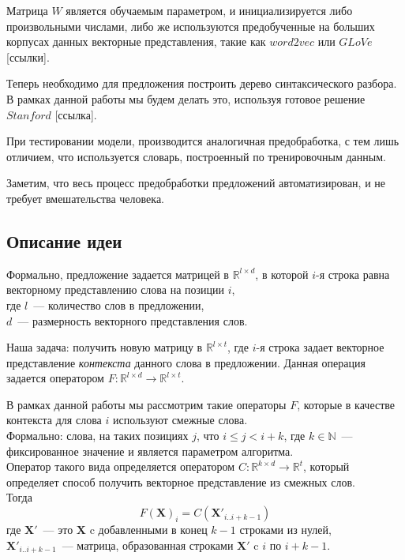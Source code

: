 Матрица $W$ является обучаемым параметром, и инициализируется либо произвольными числами, 
либо же используются предобученные на больших корпусах данных векторные представления, 
такие как $word2vec$ или $GLoVe$ [ссылки].

Теперь необходимо для предложения построить дерево синтаксического разбора.
В рамках данной работы мы будем делать это, используя готовое решение $Stanford$ [ссылка].

При тестировании модели, производится аналогичная предобработка, 
с тем лишь отличием, что используется словарь, построенный по тренировочным данным.

Заметим, что весь процесс предобработки предложений автоматизирован, 
и не требует вмешательства человека.

\subsection{Описание идеи }

Формально, предложение задается матрицей в  $\mathbb{R}^{l \times{} d}$, в которой $i$-я строка равна векторному представлению слова на позиции $i$,\\
где $l$~--- количество слов в предложении,\\
$d$~--- размерность векторного представления слов. 

Наша задача: получить новую матрицу в $\mathbb{R}^{l \times {} t}$, где $i$-я строка задает векторное представление \textit{контекста} данного слова в предложении. 
Данная операция задается оператором $F:\mathbb{R}^{l \times d} \to \mathbb{R}^{l \times t}$.

В рамках данной работы мы рассмотрим такие операторы $F$, которые в качестве контекста
для слова $i$ используют смежные слова.\\
Формально: слова, на таких позициях $j$, что $i \le j < i + k$, где $k \in \mathbb{N}$~--- фиксированное значение и является параметром алгоритма.\\Оператор такого вида определяется оператором
$C:\mathbb{R}^{k \times d} \to \mathbb{R}^t$, который определяет способ 
получить векторное представление из смежных слов. \\
Тогда $$F(\pmb{X})_i = C(\pmb{X}'_{i..i+k-1})$$
где $\pmb{X}'$~--- это $\pmb{X}$ c добавленными в конец $k-1$ строками из нулей, \\
$\pmb{X}'_{i..i+k-1}$~--- матрица, образованная строками $\pmb{X}'$ c $i$ по $i+k-1$.\par

